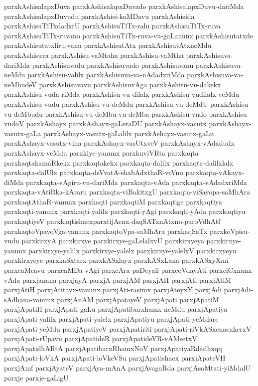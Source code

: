 {parxkAshisalapxDuva
parxkAshisalapxDuvado
parxkAshisalapxDuvu-dariMda
parxkAshisalapxDuvudu
parxkAshisi-koMDavu
parxkAshisida
parxkAshisuTiTxdadxrU
parxkAshisuTiTx-ralu
parxkAshisuTiTx-ruva
parxkAshisuTiTx-ruvano
parxkAshisuTiTx-ruva-vu-gaLanunx
parxkAshisutatxde
parxkAshisutatxliru-vanu
parxkAshisutAtx
parxkAshisutAtxneMdu
parxkAshisuva
parxkAshisu-vaMtaha
parxkAshisu-vaMtha
parxkAshisuva-dariMda
parxkAshisuvadu
parxkAshisuvado
parxkAshisuvanu
parxkAshisuva-neMdu
parxkAshisu-valilx
parxkAshisuva-va-nAdadxriMda
parxkAshisuva-va-neMbudeV
parxkAshisuvavu
parxkAshisuvAga
parxkAshisu-vu-dakekx
parxkAshisu-vuda-riMda
parxkAshisu-vu-dilalx
parxkAshisu-vudilalx-veMdu
parxkAshisu-vudu
parxkAshisu-vu-deMdu
parxkAshisu-vu-deMdU
parxkAshisu-vu-deMbudu
parxkAshisu-vu-deMbu-vu-deMba
parxkAshisu-vudo
parxkAshisu-vudoV
parxkAshayx
parxkAshayx-gaLeraDU
parxkAshayx-vasutx
parxkAshayx-vasutx-gaLa
parxkAshayx-vasutx-gaLalilx
parxkAshayx-vasutx-gaLu
parxkAshayx-vasutx-vina
parxkAshayx-vasUtxveV
parxkAshayx-vAdadudx
parxkAshayx-veMdu
parxkiye-yanunx
parxkuviVRta
parxkaqta
parxkaqtakamaRkekx
parxkaqtakekx
parxkaqta-dalilx
parxkaqta-dalilxlalx
parxkaqta-dalUlx
parxkaqta-deVvatA-shabAdxthaR-veVnu
parxkaqta-vAkayx-diMda
parxkaqta-vAgiru-vu-dariMda
parxkaqta-vAda
parxkaqta-vAdadxriMda
parxkaqta-vAtiRka-kAraru
parxkaqta-viBakitxgU
parxkaqta-viSayopa-saMhAra
parxkaqtAthaR-vanunx
parxkaqti
parxkaqtiM
parxkaqtige
parxkaqtiya
parxkaqti-yanunx
parxkaqti-yalilx
parxkaqti-yAgi
parxkaqti-yAda
parxkaqtiyu
parxkaqtiyeV
parxkaqtishacxparxtijAcnx-daqSATxnAtxnu-paroVdhAtf
parxkaqtoVpayoVga-vanunx
parxkaqtoVpa-saMhAra
parxkaqSaTx
parxkoVpisu-vudu
parxkirxyA
parxkirxye
parxkirxye-gaLelalxvU
parxkirxyeya
parxkirxye-yanunx
parxkirxye-yalilx
parxkirxye-yalelx
parxkirxye-yalelxV
parxkirxyeyu
parxkirxyeye
parxkaSxtarx
parxkASxlayx
parxkASxLana
parxkASxyXmi
parxcaMcavu
parxcaMDa-vAgi
parxcAra-paDeyali
parxcoVdayAtf
parxciCxnanx-vAda
parxjanana
parxjayA
parxjA
parxjAM
parxjAH
parxjAti
parxjAtiM
parxjAtiH
parxjAtitavx-vanunx
parxjAti-rasimx
parxjAteyxY
parxjAdi
parxjAdi-sAdhana-vanunx
parxjAnAM
parxjApatayeV
parxjApati
parxjApatiM
parxjApatiH
parxjApati-gaLu
parxjApatibarxhamx-neMdu
parxjApatiya
parxjApati-yalilx
parxjApati-yalelx
parxjApatiyu
parxjApati-yeMdare
parxjApati-yeMdu
parxjApatiyeV
parxjApatiriti
parxjApati-riVkASxcnacxkerxV
parxjApati-rUpavu
parxjApatideR
parxjApatideVR-vAMsetxV
parxjApatidhARtA
parxjApatibarxRhamxNoV
parxjApatiyaRdadhxqq
parxjApati-loVkA
parxjApati-loVkeVSu
parxjApatishacx
parxjApateVH
parxjAmf
parxjAyateV
parxjAya-mAnA
parxjAvagaRda
parxjAsaMtati-yiMdalU
parxje
parxje-gaLigU
}
